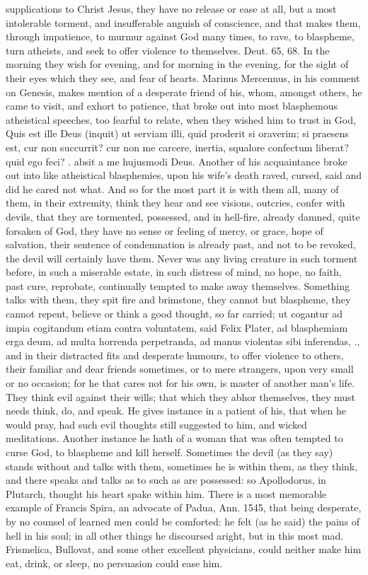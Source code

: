 {supplications to Christ Jesus, they have no release or ease at all, but
a most intolerable torment, and insufferable anguish of conscience, and
that makes them, through impatience, to murmur against God many times,
to rave, to blaspheme, turn atheists, and seek to offer violence to
themselves. Deut.  65, 68. In the morning they wish for evening,
and for morning in the evening, for the sight of their eyes which they
see, and fear of hearts. Marinus Mercennus, in his comment on
Genesis, makes mention of a desperate friend of his, whom, amongst
others, he came to visit, and exhort to patience, that broke out into
most blasphemous atheistical speeches, too fearful to relate, when they
wished him to trust in God, Quis est ille Deus (inquit) ut serviam
illi, quid proderit si oraverim; si praesens est, cur non succurrit?
cur non me carcere, inertia, squalore confectum liberat? quid ego feci?
\etc{}. absit a me hujusmodi Deus. Another of his acquaintance broke out
into like atheistical blasphemies, upon his wife's death raved, cursed,
said and did he cared not what. And so for the most part it is with
them all, many of them, in their extremity, think they hear and see
visions, outcries, confer with devils, that they are tormented,
possessed, and in hell-fire, already damned, quite forsaken of God,
they have no sense or feeling of mercy, or grace, hope of salvation,
their sentence of condemnation is already past, and not to be revoked,
the devil will certainly have them. Never was any living creature in
such torment before, in such a miserable estate, in such distress of
mind, no hope, no faith, past cure, reprobate, continually tempted to
make away themselves. Something talks with them, they spit fire and
brimstone, they cannot but blaspheme, they cannot repent, believe or
think a good thought, so far carried; ut cogantur ad impia cogitandum
etiam contra voluntatem, said Felix Plater, ad blasphemiam erga
deum, ad multa horrenda perpetranda, ad manus violentas sibi
inferendas, \etc{}., and in their distracted fits and desperate humours, to
offer violence to others, their familiar and dear friends sometimes, or
to mere strangers, upon very small or no occasion; for he that cares
not for his own, is master of another man's life. They think evil
against their wills; that which they abhor themselves, they must needs
think, do, and speak. He gives instance in a patient of his, that when
he would pray, had such evil thoughts still suggested to him, and
wicked meditations. Another instance he hath of a woman that was
often tempted to curse God, to blaspheme and kill herself. Sometimes
the devil (as they say) stands without and talks with them, sometimes
he is within them, as they think, and there speaks and talks as to such
as are possessed: so Apollodorus, in Plutarch, thought his heart spake
within him. There is a most memorable example of Francis Spira,
an advocate of Padua, Ann. 1545, that being desperate, by no counsel of
learned men could be comforted: he felt (as he said) the pains of hell
in his soul; in all other things he discoursed aright, but in this most
mad. Frismelica, Bullovat, and some other excellent physicians, could
neither make him eat, drink, or sleep, no persuasion could ease him.

}
